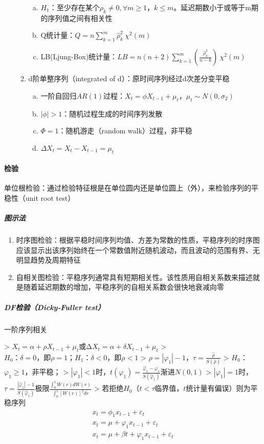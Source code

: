 \documentclass[12pt]{book}
\begin{document}
\begin{enumerate}[1.]
\begin{enumerate}[(1)]
\begin{enumerate}[a.]
        \item $H_1$：至少存在某个$\rho _k≠0,\forall m\geqslant 1，k\leqslant m$。延迟期数小于或等于m期的序列值之间有相关性  
        \item Q统计量：$Q=n\sum_{k=1}^{m}{\hat{\rho}}_k^2~\chi^2\left(m\right)$  
        \item LB(Ljung-Box)统计量：$LB=n(n+2)\sum_{k=1}^{m}{(\frac{{\hat{\rho}}_k^2}{n-k})}~\chi^2(m)$
    \end{enumerate}
    \item d阶单整序列（integrated of d）：原时间序列经过d次差分变平稳
    \begin{enumerate}[a.]
        \item 一阶自回归$AR(1)$过程：$X_t=\phi X_{t-1}+\mu_t，\mu_t\sim N(0,σ_2)$  
        \item $\left|\phi\right|>1$：随机过程生成的时间序列发散  
        \item $\Phi=1$：随机游走（random walk）过程，非平稳  
        \item $\Delta X_t=X_t-X_{t-1}=\mu_t$
    \end{enumerate}
\end{enumerate}
\end{enumerate}








\paragraph{检验}
单位根检验：通过检验特征根是在单位圆内还是单位圆上（外），来检验序列的平稳性（unit root test）

\subparagraph{图示法}

\begin{enumerate}[1.]
    \item 时序图检验：根据平稳时间序列均值、方差为常数的性质，平稳序列的时序图应该显示出该序列始终在一个常数值附近随机波动，而且波动的范围有界、无明显趋势及周期特征  
    \item 自相关图检验：平稳序列通常具有短期相关性。该性质用自相关系数来描述就是随着延迟期数的增加，平稳序列的自相关系数会很快地衰减向零
\end{enumerate}


\subparagraph{DF检验（Dicky-Fuller test）}

一阶序列相关

> $X_t=\alpha+\rho X_{t-1}+\mu_t$或$∆X_t=α+δX_{t-1}+μ_{t}$  
> $H_0：δ=0，即ρ=1；H_1：δ<0，即ρ<1 $  
> $\rho=\left|\varphi_1\right|-1， \tau=\frac{\hat{\rho}}{S(\hat{\rho})}$  
> $H_0$：$φ_1≥1$，非平稳；  
> $\left|\varphi_1\right|<1$时，$t(φ_1)=\frac{\hat{φ}_1-φ_1}{S(\hat{φ}_1)}$渐进$N(0,1)$  
> $\left|\varphi_1\right|=1$时，$τ=\frac{|\hat{φ}_1|-1}{S(\hat{φ}_1)}$极限$\frac{\int_{0}^{1}W(r)dW(r)}{\int_{0}^{1}[W(r)]^2dr}$  
> 若拒绝$H_0$（$t<\tau$临界值，$t$统计量有偏误）则为平稳序列  
\begin{gather*}
x_t=\phi_{1}x_{t-1}+\varepsilon_t\\
x_t=\mu+\varphi_{1}x_{t-1}+\varepsilon_t\\
x_t=\mu+\beta t+\varphi_{1}x_{t-1}+\varepsilon_t
\end{gather*}
\end{document}
